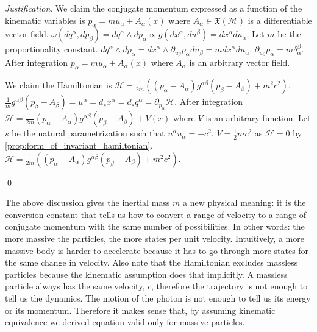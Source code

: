\documentclass[aps,pra,10pt,twocolumn,floatfix,nofootinbib]{revtex4-1}
\numberwithin{equation}{section}
\theoremstyle{definition}
\newenvironment{justification}{\emph{Justification}.}{\qed}
\begin{document}
\begin{justification}
	We claim the conjugate momentum expressed as a function of the kinematic variables is $p_\alpha = m u_\alpha + A_\alpha(x)$ where $A_\alpha \in \mathfrak{X}(\mathcal{M})$ is a differentiable vector field. $\omega(dq^\alpha, dp_\beta) = dq^\alpha \wedge dp_\alpha \propto g(dx^\alpha, du^\beta) = dx^\alpha du_\alpha$. Let $m$ be the proportionality constant. $dq^\alpha \wedge dp_\alpha = dx^\alpha \wedge \partial_{u_\beta} p_\alpha du_\beta = m dx^\alpha du_\alpha$. $\partial_{u_\beta} p_\alpha = m \delta_\alpha^\beta$. After integration $p_\alpha = m u_\alpha + A_\alpha(x)$ where $A_\alpha$ is an arbitrary vector field.
	
	We claim the Hamiltonian is $\mathcal{H}=\frac{1}{2m}((p_\alpha-A_\alpha)g^{\alpha\beta}(p_\beta-A_\beta) + m^2 c^2)$.  $\frac{1}{m}g^{\alpha\beta}(p_\beta-A_\beta) = u^\alpha = d_s x^\alpha = d_s q^\alpha = \partial_{p_\alpha} \mathcal{H}$. After integration $\mathcal{H}=\frac{1}{2m}(p_\alpha-A_\alpha)g^{\alpha\beta}(p_\beta-A_\beta)+V(x)$ where $V$ is an arbitrary function. Let $s$ be the natural parametrization such that $u^\alpha u_\alpha = - c^2$. $V= \frac{1}{2}m c^2$ as $\mathcal{H}=0$ by \ref{prop:form_of_invariant_hamiltonian}. $\mathcal{H}=\frac{1}{2m}((p_\alpha-A_\alpha)g^{\alpha\beta}(p_\beta-A_\beta) + m^2 c^2)$.
	
\end{justification}

The above discussion gives the inertial mass $m$ a new physical meaning: it is the conversion constant that tells us how to convert a range of velocity to a range of conjugate momentum with the same number of possibilities. In other words: the more massive the particles, the more states per unit velocity. Intuitively, a more massive body is harder to accelerate because it has to go through more states for the same change in velocity. Also note that the Hamiltonian excludes massless particles because the kinematic assumption does that implicitly. A massless particle always has the same velocity, $c$, therefore the trajectory is not enough to tell us the dynamics. The motion of the photon is not enough to tell us its energy or its momentum. Therefore it makes sense that, by assuming kinematic equivalence we derived equation valid only for massive particles.
\end{document}
